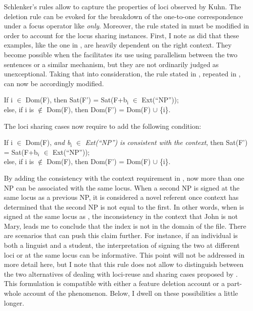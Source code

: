 \documentclass[output=paper,
modfonts
]{langscibook}
\begin{document}
Schlenker's rules allow to capture the properties of loci observed by Kuhn. The deletion rule can be evoked for the breakdown of the one-to-one correspondence under a focus operator like \textit{only}. Moreover, the rule stated in  must be modified in order to account for the locus sharing instances. First, I note as \citeauthor{Kuhn2015} did that these examples, like the one in , are heavily dependent on the right context. They become possible when the  facilitates its use using parallelism between the two sentences or a similar mechanism, but they are not ordinarily judged as unexceptional. Taking that into consideration, the rule stated in , repeated in , can now be accordingly modified. 

\begin{exe}
	\ex \label{ex:irani:79} If i \(\in\) Dom(F), then Sat(F') = Sat(F+b$_\text{i}$ \(\in\) Ext(``NP''));\\ else, if i is \(\notin\) Dom(F), then Dom(F') = Dom(F) \(\cup\) \{i\}. 
\end{exe}

The loci sharing cases now require to add the following condition: 

\begin{exe}
	\ex \label{ex:irani:80} If i \(\in\) Dom(F), \textit{and b$_\text{i}$ \(\in\) Ext(``NP'') is consistent with the context}, then Sat(F') = Sat(F+b$_i$ \(\in\) Ext(``NP''));\\ 
	else, if i is \(\notin\) Dom(F), then Dom(F') = Dom(F) \(\cup\) \{i\}. \par  
\end{exe}

By adding the consistency with the context requirement in , now more than one NP can be associated with the same locus. When a second NP is signed at the same locus as a previous NP, it is considered a novel referent once context has determined that the second NP is not equal to the first. In other words, when  is signed at the same locus as , the inconsistency in the context that John is not Mary, leads me to conclude that the index is not in the domain of the file. There are scenarios that can push this claim further. For instance, if an individual is both a linguist and a student, the interpretation of signing the two at different loci or at the same locus can be informative. This point will not be addressed in more detail here, but I note that this rule does not allow to distinguish between the two alternatives of dealing with loci-reuse and sharing cases proposed by \citeauthor{Schlenker2014}. This formulation is compatible with either a feature deletion account or a part-whole account of the phenomenon. Below, I dwell on these possibilities a little longer. 
\end{document}

